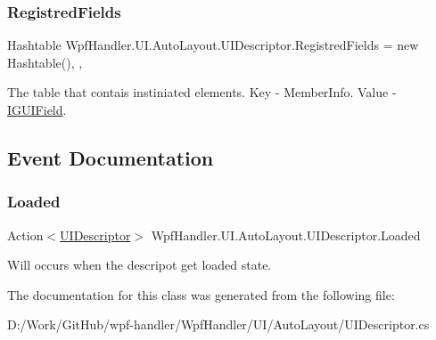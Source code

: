 \subsubsection{\texorpdfstring{Registred\+Fields}{RegistredFields}}
{\footnotesize\ttfamily Hashtable Wpf\+Handler.\+U\+I.\+Auto\+Layout.\+U\+I\+Descriptor.\+Registred\+Fields = new Hashtable()\hspace{0.3cm}{\ttfamily [get]}, {\ttfamily [set]}, {\ttfamily [private]}}



The table that contais instiniated elements. Key -\/ Member\+Info. Value -\/ \mbox{\hyperlink{interface_wpf_handler_1_1_u_i_1_1_auto_layout_1_1_i_g_u_i_field}{I\+G\+U\+I\+Field}}. 



\subsection{Event Documentation}
\mbox{\label{class_wpf_handler_1_1_u_i_1_1_auto_layout_1_1_u_i_descriptor_abaa60ede8bf9e59734238f1beadaf50e}} 
\subsubsection{\texorpdfstring{Loaded}{Loaded}}
{\footnotesize\ttfamily Action$<$\mbox{\hyperlink{class_wpf_handler_1_1_u_i_1_1_auto_layout_1_1_u_i_descriptor}{U\+I\+Descriptor}}$>$ Wpf\+Handler.\+U\+I.\+Auto\+Layout.\+U\+I\+Descriptor.\+Loaded}



Will occurs when the descripot get loaded state. 



The documentation for this class was generated from the following file\+:\begin{DoxyCompactItemize}
\item 
D\+:/\+Work/\+Git\+Hub/wpf-\/handler/\+Wpf\+Handler/\+U\+I/\+Auto\+Layout/U\+I\+Descriptor.\+cs\end{DoxyCompactItemize}
